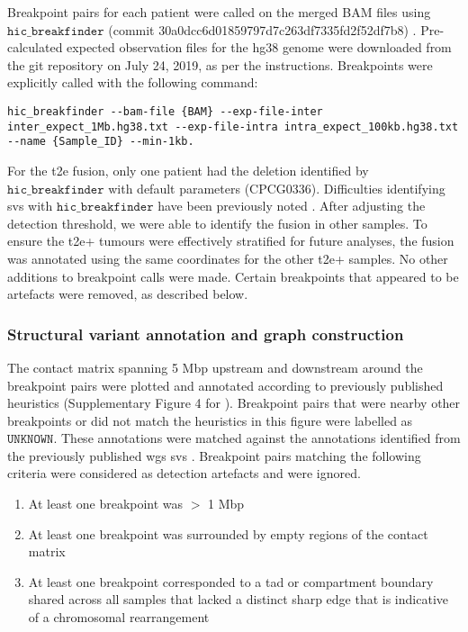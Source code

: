 Breakpoint pairs for each patient were called on the merged BAM files using $\texttt{hic\_breakfinder}$ (commit 30a0dcc6d01859797d7c263df7335fd2f52df7b8) \cite{dixonIntegrativeDetectionAnalysis2018}.
Pre-calculated expected observation files for the hg38 genome were downloaded from the git repository on July 24, 2019, as per the instructions.
Breakpoints were explicitly called with the following command:

\begin{lstlisting}[basicstyle=\ttfamily]
hic_breakfinder --bam-file {BAM} --exp-file-inter inter_expect_1Mb.hg38.txt --exp-file-intra intra_expect_100kb.hg38.txt --name {Sample_ID} --min-1kb.
\end{lstlisting}

For the \gls{t2e} fusion, only one patient had the deletion identified by $\texttt{hic\_breakfinder}$ with default parameters (CPCG0336).
Difficulties identifying \glspl{sv} with $\texttt{hic\_breakfinder}$ have been previously noted \cite{hoStructuralVariationSequencing2020}.
After adjusting the detection threshold, we were able to identify the fusion in other samples.
To ensure the \gls{t2e}+ tumours were effectively stratified for future analyses, the fusion was annotated using the same coordinates for the other \gls{t2e}+ samples.
No other additions to breakpoint calls were made.
Certain breakpoints that appeared to be artefacts were removed, as described below.

\subsubsection{Structural variant annotation and graph construction}

The contact matrix spanning 5 Mbp upstream and downstream around the breakpoint pairs were plotted and annotated according to previously published heuristics (Supplementary Figure 4 for \cite{dixonIntegrativeDetectionAnalysis2018}).
Breakpoint pairs that were nearby other breakpoints or did not match the heuristics in this figure were labelled as $\texttt{UNKNOWN}$.
These annotations were matched against the annotations identified from the previously published \gls{wgs} \glspl{sv} \cite{fraserGenomicHallmarksLocalized2017}.
Breakpoint pairs matching the following criteria were considered as detection artefacts and were ignored.

\begin{enumerate}
  \item At least one breakpoint was $>$ 1 Mbp
  \item At least one breakpoint was surrounded by empty regions of the contact matrix
  \item At least one breakpoint corresponded to a \gls{tad} or compartment boundary shared across all samples that lacked a distinct sharp edge that is indicative of a chromosomal rearrangement
\end{enumerate}

